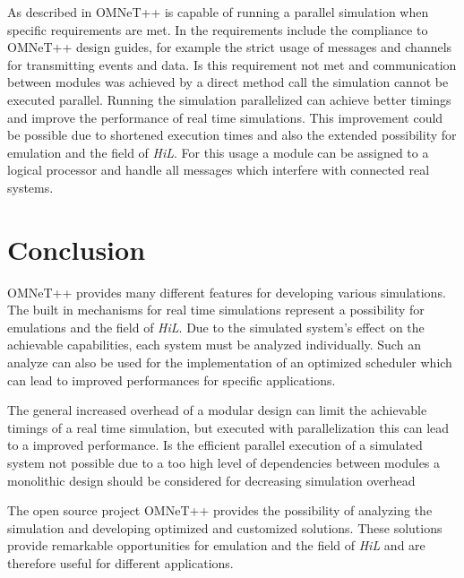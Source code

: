 \documentclass[journal]{IEEEtran}
\begin{document}
As described in \cite{varga_parallel_2003} OMNeT++ is capable of running a parallel simulation when specific requirements are met.
In \cite{varga_parallel_2003} the requirements include the compliance to OMNeT++ design guides, for example the strict usage of messages and channels for transmitting events and data.
Is this requirement not met and communication between modules was achieved by a direct method call the simulation cannot be executed parallel.
Running the simulation parallelized can achieve better timings and improve the performance of real time simulations.
This improvement could be possible due to shortened execution times and also the extended possibility for emulation and the field of \emph{HiL}.
For this usage a module can be assigned to a logical processor and handle all messages which interfere with connected real systems.

\section{Conclusion}
OMNeT++ provides many different features for developing various simulations.
The built in mechanisms for real time simulations represent a possibility for emulations and the field of \emph{HiL}.
Due to the simulated system's effect on the achievable capabilities, each system must be analyzed individually.
Such an analyze can also be used for the implementation of an optimized scheduler which can lead to improved performances for specific applications.

The general increased overhead of a modular design can limit the achievable timings of a real time simulation, but executed with parallelization this can lead to a improved performance.
Is the efficient parallel execution of a simulated system not possible due to a too high level of dependencies between modules a monolithic design should be considered for decreasing simulation overhead

The open source project OMNeT++ provides the possibility of analyzing the simulation and developing optimized and customized solutions.
These solutions provide remarkable opportunities for emulation and the field of \emph{HiL} and are therefore useful for different applications.
\printbibliography
\end{document}
